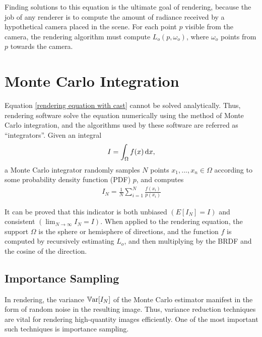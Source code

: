 Finding solutions to this equation is the ultimate goal of rendering, because the job of any renderer is to compute the amount of radiance received by a hypothetical camera placed in the scene. For each point $p$ visible from the camera, the rendering algorithm must compute $L_o(p,\omega_o)$, where $\omega_o$ points from $p$ towards the camera. 

\section{Monte Carlo Integration}

Equation \ref{rendering equation with cast} cannot be solved analytically. Thus, rendering software solve the equation numerically using the method of Monte Carlo integration, and the algorithms used by these software are referred as ``integrators''. Given an integral
\begin{align*}
    I = \int_\Omega f(x) \,\mathrm{d} x,
\end{align*}
a Monte Carlo integrator randomly samples $N$ points $x_1,...,x_n\in \Omega$ according to some probability density function (PDF) $p$, and computes
\begin{align}
    I_N = \frac{1}{N}\sum_{i=1}^{N} \frac{f(x_i)}{p(x_i)}
    \label{monte carlo estimator}
\end{align}

It can be proved that this indicator is both unbiased $(E[I_N]=I)$ and consistent $(\lim_{N\to\infty}I_N = I)$. When applied to the rendering equation, the support $\Omega$ is the sphere or hemisphere of directions, and the function $f$ is computed by recursively estimating $L_o$, and then multiplying by the BRDF and the cosine of the direction.

\subsection{Importance Sampling}
\label{subsection IS}
In rendering, the variance $\mathbb{V}\text{ar}[I_N]$ of the Monte Carlo estimator manifest in the form of random noise in the resulting image. Thus, variance reduction techniques are vital for rendering high-quantity images efficiently. One of the most important such techniques is importance sampling.

